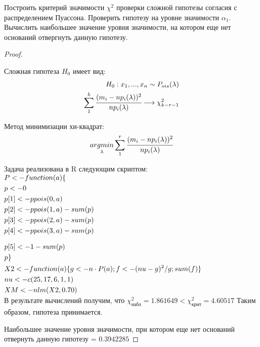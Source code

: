 \begin{problem}
	Построить критерий значимости $\chi^2$ проверки сложной гипотезы согласия с распределением Пуассона. Проверить гипотезу на уровне значимости $\alpha_1$. Вычислить наибольшее значение уровня значимости, на котором еще нет оснований отвергнуть данную гипотезу. 
\end{problem}

\begin{proof}
	$ $
	
	Сложная гипотеза $H_0$ имеет вид:
	\begin{align}
		H_0: x_1,...,x_n \sim P_{ois}(\lambda) \\
		\sum\limits_1^k\cfrac{(m_i-np_i(\lambda))^2}{np_i(\lambda)}\longrightarrow\chi^2_{k-r-1}
	\end{align}	

	Метод минимизации хи-квадрат:
	\begin{equation}
		\underset{\lambda}{argmin}\sum\limits_1^r\cfrac{(m_i-np_i(\lambda))^2}{np_i(\lambda)}
	\end{equation}
	
	Задача реализована в R следующим скриптом: \\
	
	$\begin{gathered}
		P <- function(a)\{ \hfill \\
		p <- 0 \hfill \\
		p[1] <- ppois(0, a) \hfill \\
		p[2] <- ppois(1, a) - sum(p) \hfill \\
		p[3] <- ppois(2, a) - sum(p) \hfill \\
		p[4] <- ppois(3, a) - sum(p) \hfill \\
	\end{gathered}$
	
	$\begin{gathered}
	p[5] <- 1-sum(p) \hfill \\
	p\} \hfill \\
	X2 <- function(a)\{g <- n\cdot P(a); f <- (nu-g)^2/g; sum(f)\} \hfill \\
	nu <- c(25, 17, 6, 1, 1) \hfill \\
	XM <- nlm(X2, 0.70) \hfill \\
	\end{gathered}$ \\
	
	В результате вычислений получим, что $\chi^2_{\text{набл}}=1.861649<\chi^2_{\text{крит}}=4.60517$ 
	Таким образом, гипотеза принимается. 
	
	Наибольшее значение уровня значимости, при котором еще нет оснований отвернуть данную гипотезу = $0.3942285$	
\end{proof}


